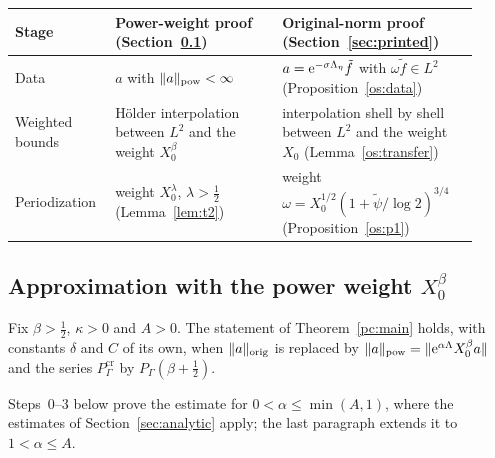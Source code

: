 \begin{center}
\small
{}\label{tab:compare}
\begin{tabular}{@{}>{\raggedright\arraybackslash}p{0.18\linewidth}>{\raggedright\arraybackslash}p{0.34\linewidth}>{\raggedright\arraybackslash}p{0.40\linewidth}@{}}
\hline
Stage & Power-weight proof (Section~\ref{subsec:dd-thm}) & Original-norm proof (Section~\ref{sec:printed})\\
\hline
Data & $a$ with $\lVert a\rVert_{\mathrm{pow}}<\infty$ & $a=\mathrm{e}^{-\sigma\Lambda_\eta}\tilde f$ with $\omega\tilde f\in L^2$ (Proposition~\ref{os:data})\\[4pt]
Weighted bounds & H\"older interpolation between $L^2$ and the weight $X_0^\beta$ & interpolation shell by shell between $L^2$ and the weight $X_0$ (Lemma~\ref{os:transfer})\\[4pt]
Periodization & weight $X_0^\lambda$, $\lambda>\tfrac12$ (Lemma~\ref{lem:t2}) & weight $\omega=X_0^{1/2}(1+\tilde\psi/\log2)^{3/4}$ (Proposition~\ref{os:p1})\\
\hline
\end{tabular}
\end{center}

\subsection{Approximation with the power weight \texorpdfstring{$X_0^\beta$}{X0}}\label{subsec:dd-thm}

\begin{theorem}\label{thm:dd-appx}
Fix $\beta>\tfrac12$, $\kappa>0$ and $A>0$. The statement of Theorem~\ref{pc:main} holds, with constants $\delta$ and $C$ of its
own, when $\lVert a\rVert_{\mathrm{orig}}$ is replaced by $\lVert a\rVert_{\mathrm{pow}}=\lVert \mathrm{e}^{\alpha\Lambda}X_0^\beta a\rVert$ and the series $P^{\mathrm{cr}}_\Gamma$ by
$P_\Gamma(\beta+\tfrac12)$.
\end{theorem}

Steps~0--3 below prove the estimate for $0<\alpha\le\min(A,1)$, where the estimates of Section~\ref{sec:analytic} apply; the
last paragraph extends it to $1<\alpha\le A$.

